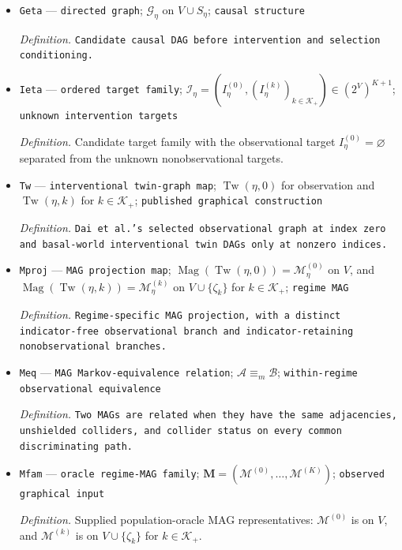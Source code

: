 \documentclass{article}
\begin{document}
\begin{itemize}
  \item \texttt{Geta} --- \texttt{directed graph}; \(\mathcal G_\eta\) on \(V\cup S_\eta\); \texttt{causal structure}
  \par\smallskip\noindent\emph{Definition.} \texttt{Candidate causal DAG before intervention and selection conditioning.}
  \item \texttt{Ieta} --- \texttt{ordered target family}; \(\mathcal I_\eta=(I_\eta^{(0)},(I_\eta^{(k)})_{k\in\mathcal K_+})\in(2^V)^{K+1}\); \texttt{unknown intervention targets}
  \par\smallskip\noindent\emph{Definition.} Candidate target family with the observational target \(I_\eta^{(0)}=\varnothing\) separated from the unknown nonobservational targets.
  \item \texttt{Tw} --- \texttt{interventional twin-\allowbreak{}graph map}; \(\operatorname{Tw}(\eta,0)\) for observation and \(\operatorname{Tw}(\eta,k)\) for \(k\in\mathcal K_+\); \texttt{published graphical construction}
  \par\smallskip\noindent\emph{Definition.} \texttt{Dai et al.'s selected observational graph at index zero and basal-\allowbreak{}world interventional twin DAGs only at nonzero indices.}
  \item \texttt{Mproj} --- \texttt{MAG projection map}; \(\operatorname{Mag}(\operatorname{Tw}(\eta,0))=\mathcal M_\eta^{(0)}\) on \(V\), and \(\operatorname{Mag}(\operatorname{Tw}(\eta,k))=\mathcal M_\eta^{(k)}\) on \(V\cup\{\zeta_k\}\) for \(k\in\mathcal K_+\); \texttt{regime MAG}
  \par\smallskip\noindent\emph{Definition.} \texttt{Regime-\allowbreak{}specific MAG projection,\allowbreak{} with a distinct indicator-\allowbreak{}free observational branch and indicator-\allowbreak{}retaining nonobservational branches.}
  \item \texttt{Meq} --- \texttt{MAG Markov-\allowbreak{}equivalence relation}; \(\mathcal A\equiv_m\mathcal B\); \texttt{within-\allowbreak{}regime observational equivalence}
  \par\smallskip\noindent\emph{Definition.} \texttt{Two MAGs are related when they have the same adjacencies,\allowbreak{} unshielded colliders,\allowbreak{} and collider status on every common discriminating path.}
  \item \texttt{Mfam} --- \texttt{oracle regime-\allowbreak{}MAG family}; \(\mathbf M=(\mathcal M^{(0)},\ldots,\mathcal M^{(K)})\); \texttt{observed graphical input}
  \par\smallskip\noindent\emph{Definition.} Supplied population-oracle MAG representatives: \(\mathcal M^{(0)}\) is on \(V\), and \(\mathcal M^{(k)}\) is on \(V\cup\{\zeta_k\}\) for \(k\in\mathcal K_+\).

\end{itemize}
\end{document}
